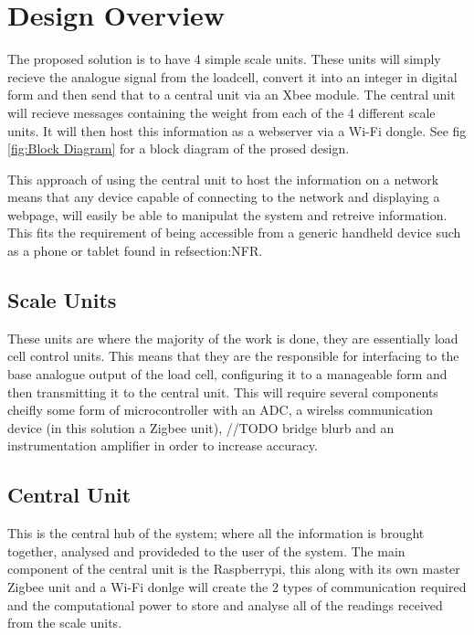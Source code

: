 \section{Design Overview}
\label{DO}
The proposed solution is to have 4 simple scale units. These units will simply recieve the analogue signal from the loadcell, convert it into an integer in digital form and then send that to a central unit via an Xbee module. The central unit will recieve messages containing the weight from each of the 4 different scale units. It will then host this information as a webserver via a Wi-Fi dongle. See fig \ref{fig:Block Diagram} for a block diagram of the prosed design.

This approach of using the central unit to host the information on a network means that any device capable of connecting to the network and displaying a webpage, will easily be able to manipulat the system and retreive information. This fits the requirement of being accessible from a generic handheld device such as a phone or tablet found in ref{section:NFR}.

\subsection{Scale Units}
\label{SU}
These units are where the majority of the work is done, they are essentially load cell control units. This means that they are the responsible for interfacing to the base analogue output of the load cell, configuring it to a manageable form and then transmitting it to the central unit. This will require several components cheifly some form of microcontroller with an ADC, a wirelss communication device (in this solution a Zigbee unit), //TODO bridge blurb and an instrumentation amplifier in order to increase accuracy.  

\subsection{Central Unit}
\label{CU}
This is the central hub of the system; where all the information is brought together, analysed and provideded to the user of the system. The main component of the central unit is the Raspberrypi, this along with its own master Zigbee unit and a Wi-Fi donlge will create the 2 types of communication required and the computational power to store and analyse all of the readings received from the scale units.  
